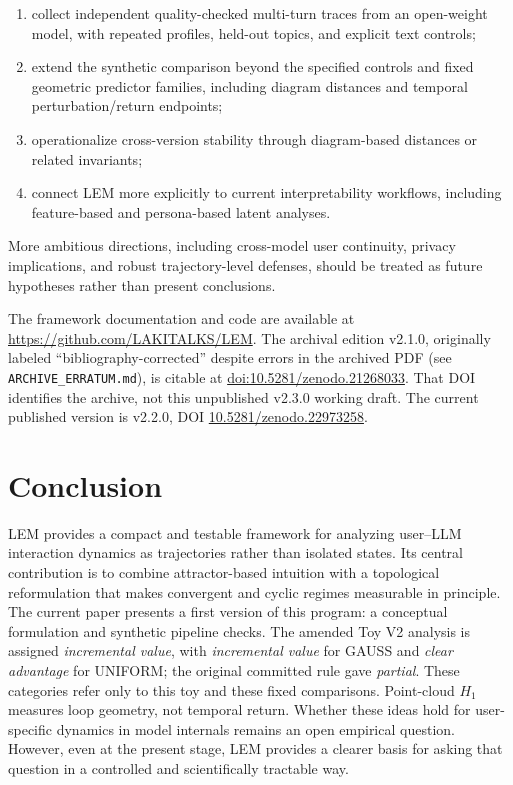 \documentclass[11pt]{article}
\begin{document}
\begin{enumerate}[leftmargin=1.8em]
  \item collect independent quality-checked multi-turn traces from an open-weight
        model, with repeated profiles, held-out topics, and explicit text controls;
  \item extend the synthetic comparison beyond the specified controls and fixed
        geometric predictor families, including diagram distances and temporal
        perturbation/return endpoints;
  \item operationalize cross-version stability through diagram-based distances or
        related invariants;
  \item connect LEM more explicitly to current interpretability workflows, including
        feature-based and persona-based latent analyses.
\end{enumerate}

More ambitious directions, including cross-model user continuity, privacy
implications, and robust trajectory-level defenses, should be treated as future
hypotheses rather than present conclusions.

The framework documentation and code are available at
\url{https://github.com/LAKITALKS/LEM}. The archival edition v2.1.0,
originally labeled ``bibliography-corrected'' despite errors in the archived
PDF (see \texttt{ARCHIVE\_ERRATUM.md}), is citable at
\href{https://doi.org/10.5281/zenodo.21268033}{doi:10.5281/zenodo.21268033}.
That DOI identifies the archive, not this unpublished v2.3.0 working draft. The current published
version is v2.2.0, DOI \href{https://doi.org/10.5281/zenodo.22973258}{10.5281/zenodo.22973258}.


\section{Conclusion}

LEM provides a compact and testable framework for analyzing user--LLM interaction
dynamics as trajectories rather than isolated states. Its central contribution is to
combine attractor-based intuition with a topological reformulation that makes
convergent and cyclic regimes measurable in principle. The current paper presents a
first version of this program: a conceptual formulation and synthetic pipeline
checks. The amended Toy V2 analysis is assigned \textit{incremental value}, with
\textit{incremental value} for GAUSS and \textit{clear advantage} for UNIFORM;
the original committed rule gave \textit{partial}. These categories refer only
to this toy and these fixed comparisons. Point-cloud $H_1$ measures loop geometry,
not temporal return. Whether these ideas hold for user-specific dynamics in model internals remains an
open empirical question. However, even at the present stage, LEM provides a clearer
basis for asking that question in a controlled and scientifically tractable way.
\end{document}
